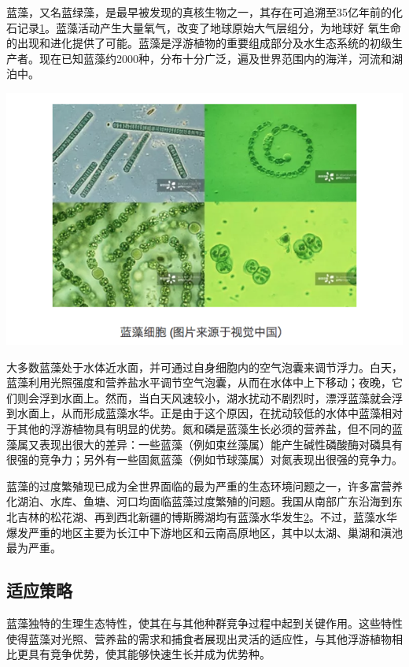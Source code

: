 \documentclass[]{book}
\begin{document}
蓝藻，又名蓝绿藻，是最早被发现的真核生物之一，其存在可追溯至35亿年前的化石记录\href{陈心想，耿增超。西北农林科技大学学报（自然科学版），2013，41:\%20167-174．}{1}。蓝藻活动产生大量氧气，改变了地球原始大气层组分，为地球好
氧生命的出现和进化提供了可能。蓝藻是浮游植物的重要组成部分及水生态系统的初级生产者。现在已知蓝藻约2000种，分布十分广泛，遍及世界范围内的海洋，河流和湖泊中。

\includegraphics[width=8.33in]{images/lanzao1}

大多数蓝藻处于水体近水面，并可通过自身细胞内的空气泡囊来调节浮力。白天，蓝藻利用光照强度和营养盐水平调节空气泡囊，从而在水体中上下移动；夜晚，它们则会浮到水面上。然而，当白天风速较小，湖水扰动不剧烈时，漂浮蓝藻就会浮到水面上，从而形成蓝藻水华。正是由于这个原因，在扰动较低的水体中蓝藻相对于其他的浮游植物具有明显的优势。氮和磷是蓝藻生长必须的营养盐，但不同的蓝藻属又表现出很大的差异：一些蓝藻（例如束丝藻属）能产生碱性磷酸酶对磷具有很强的竞争力；另外有一些固氮蓝藻（例如节球藻属）对氮表现出很强的竞争力。

蓝藻的过度繁殖现已成为全世界面临的最为严重的生态环境问题之一，许多富营养化湖泊、水库、鱼塘、河口均面临蓝藻过度繁殖的问题。我国从南部广东沿海到东北吉林的松花湖、再到西北新疆的博斯腾湖均有蓝藻水华发生\href{Kezhen\%20Qian,\%20Ajay\%20Kumar,\%20et.al.\%20Renew.\%20and\%20Sustain.\%20Energy\%20Reviews,\%202015,\%2042:\%201055-1064.}{2}。不过，蓝藻水华爆发严重的地区主要为长江中下游地区和云南高原地区，其中以太湖、巢湖和滇池最为严重。

\subsection{适应策略}

蓝藻独特的生理生态特性，使其在与其他种群竞争过程中起到关键作用。这些特性使得蓝藻对光照、营养盐的需求和捕食者展现出灵活的适应性，与其他浮游植物相比更具有竞争优势，使其能够快速生长并成为优势种。
\end{document}
